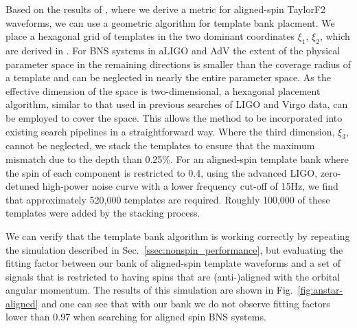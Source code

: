 Based on the results of \cite{Brown:2012qf}, where we derive a metric for
aligned-spin TaylorF2 waveforms, we can use a geometric algorithm for template
bank placment. We place a hexagonal grid of templates
in the two dominant coordinates $\xi_1$, $\xi_2$, which are derived
in \cite{Brown:2012qf}. For BNS systems in aLIGO 
and AdV the extent of the physical parameter
space in the remaining directions is smaller
than the coverage radius of a template and can be neglected in nearly the entire parameter space.
As the effective dimension  of the space is two-dimensional, a
hexagonal placement algorithm, similar to that used in previous searches of
LIGO and Virgo data, can be employed to cover the space. This allows the
method to be incorporated into existing search pipelines in a straightforward
way. Where the third dimension, $\xi_3$, cannot be neglected, we stack the templates
to ensure that the maximum mismatch due to the depth than 0.25\%.
For an aligned-spin template bank where the spin of each component is restricted to 0.4,
using the advanced LIGO, zero-detuned high-power noise curve with a lower frequency cut-off of 15Hz,
we find that approximately 520,000 templates are required.
Roughly 100,000 of these templates were added by the stacking process.

We can verify that the template bank algorithm is working correctly by repeating the simulation described
in Sec.~\ref{ssec:nonspin_performance}, but evaluating the fitting factor between our bank of aligned-spin
template waveforms and a set of signals that is restricted to having spins that are (anti-)aligned with the
orbital angular momentum. The results of this simulation are shown in Fig.~\ref{fig:anstar-aligned} and
one can see that with our bank we do not observe fitting factors lower than 0.97 when searching for aligned
spin BNS systems.

